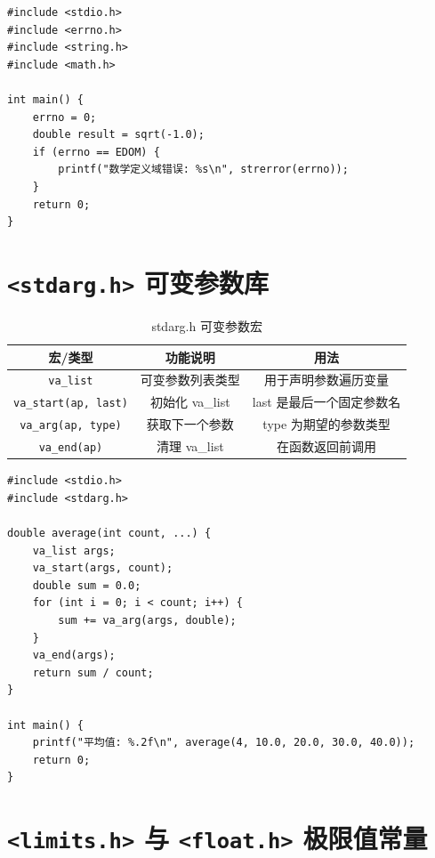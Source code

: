 \noindent\begin{minipage}{\textwidth}
\begin{lstlisting}[caption={errno 使用示例}]
#include <stdio.h>
#include <errno.h>
#include <string.h>
#include <math.h>

int main() {
    errno = 0;
    double result = sqrt(-1.0);
    if (errno == EDOM) {
        printf("数学定义域错误: %s\n", strerror(errno));
    }
    return 0;
}
\end{lstlisting}
\end{minipage}

\section{\texorpdfstring{\texttt{<stdarg.h>} 可变参数库}{<stdarg.h> 可变参数库}}

\begin{table}[H]
\centering
\renewcommand{\arraystretch}{1.6}
\begin{tabulary}{\linewidth}{CCC}
\toprule
\textbf{宏/类型} & \textbf{功能说明} & \textbf{用法} \\ \midrule
\texttt{va\_list} & 可变参数列表类型 & 用于声明参数遍历变量 \\ 
\texttt{va\_start(ap, last)} & 初始化 va\_list & last 是最后一个固定参数名 \\ 
\texttt{va\_arg(ap, type)} & 获取下一个参数 & type 为期望的参数类型 \\ 
\texttt{va\_end(ap)} & 清理 va\_list & 在函数返回前调用 \\ \bottomrule
\end{tabulary}
\caption{stdarg.h 可变参数宏}
\label{tab:stdarg_funcs}
\end{table}

\noindent\begin{minipage}{\textwidth}
\begin{lstlisting}[caption={可变参数函数示例}]
#include <stdio.h>
#include <stdarg.h>

double average(int count, ...) {
    va_list args;
    va_start(args, count);
    double sum = 0.0;
    for (int i = 0; i < count; i++) {
        sum += va_arg(args, double);
    }
    va_end(args);
    return sum / count;
}

int main() {
    printf("平均值: %.2f\n", average(4, 10.0, 20.0, 30.0, 40.0));
    return 0;
}
\end{lstlisting}
\end{minipage}

\section{\texorpdfstring{\texttt{<limits.h>} 与 \texttt{<float.h>} 极限值常量}{<limits.h> 与 <float.h> 极限值常量}}

